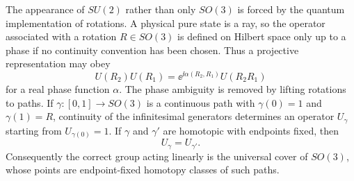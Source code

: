 The appearance of \(SU(2)\) rather than only \(SO(3)\) is forced by the
quantum implementation of rotations. A physical pure state is a ray, so the
operator associated with a rotation \(R\in SO(3)\) is defined on Hilbert
space only up to a phase if no continuity convention has been chosen. Thus a
projective representation may obey
\[
  U(R_2)U(R_1)
  =
  \ee^{\ii\alpha(R_2,R_1)}U(R_2R_1)
\]
for a real phase function \(\alpha\). The phase ambiguity is removed by
lifting rotations to paths. If \(\gamma:[0,1]\to SO(3)\) is a continuous path
with \(\gamma(0)=1\) and \(\gamma(1)=R\), continuity of the infinitesimal
generators determines an operator \(U_\gamma\) starting from \(U_{\gamma(0)}=1\).
If \(\gamma\) and \(\gamma'\) are homotopic with endpoints fixed, then
\[
  U_\gamma=U_{\gamma'} .
\]
Consequently the correct group acting linearly is the universal cover of
\(SO(3)\), whose points are endpoint-fixed homotopy classes of such paths.

\begin{center}
\end{center}

